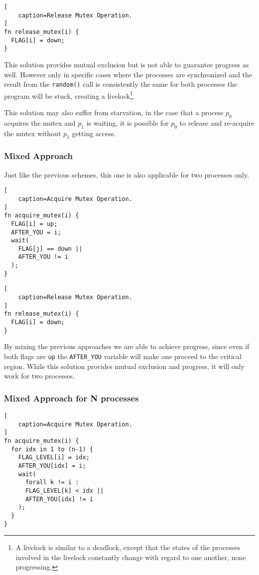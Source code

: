 \begin{lstlisting}[
    caption=Release Mutex Operation.
]
fn release_mutex(i) {
  FLAG[i] = down;
}
\end{lstlisting}

This solution provides mutual exclusion but is not able to guarantee progress as well.
However only in specific cases where the processes are synchronized and the result from the \texttt{random()} call is consistently the same for both processes the program will be stuck,
creating a livelock\footnote{A livelock is similar to a deadlock, except that the states of the processes involved in the livelock constantly change with regard to one another, none progressing.}.

This solution may also suffer from starvation,
in the case that a process $p_0$ acquires the mutex and $p_1$ is waiting,
it is possible for $p_0$ to release and re-acquire the mutex without $p_1$ getting access.

\subsubsection{Mixed Approach}\label{sec:mixed}

Just like the previous schemes,
this one is also applicable for two processes only.


\begin{lstlisting}[
    caption=Acquire Mutex Operation.
]
fn acquire_mutex(i) {
  FLAG[i] = up;
  AFTER_YOU = i;
  wait(
    FLAG[j] == down ||
    AFTER_YOU != i
  );
}
\end{lstlisting}

\begin{lstlisting}[
    caption=Release Mutex Operation.
]
fn release_mutex(i) {
  FLAG[i] = down;
}
\end{lstlisting}

By mixing the previous approaches we are able to achieve progress,
since even if both flags are \texttt{up} the \texttt{AFTER\_YOU} variable will make one proceed to the critical region.
While this solution provides mutual exclusion and progress,
it will only work for two processes.

\subsubsection{Mixed Approach for N processes}

\begin{lstlisting}[
    caption=Acquire Mutex Operation.
]
fn acquire_mutex(i) {
  for idx in 1 to (n-1) {
    FLAG_LEVEL[i] = idx;
    AFTER_YOU[idx] = i;
    wait(
      forall k != i :
      FLAG_LEVEL[k] < idx ||
      AFTER_YOU[idx] != i
    );
  }
}
\end{lstlisting}

